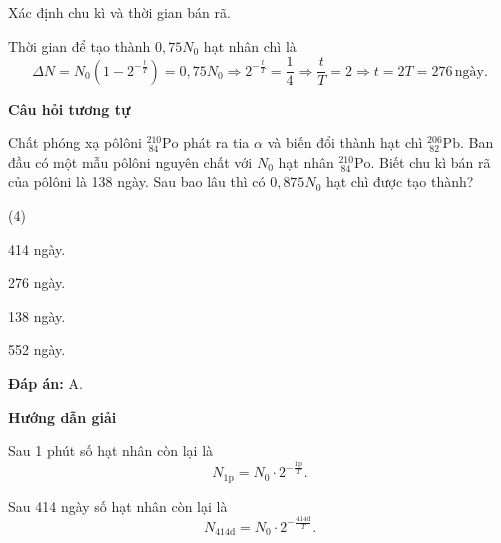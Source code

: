 \begin{dang}{Xác định chu kì và thời gian bán rã.}
{	Thời gian để tạo thành $0,75N_0$ hạt nhân chì là
	\begin{equation*}
	\Delta N= N_0\left( 1-2^{-\frac{t}{T}}\right)=0,75N_0\Rightarrow 2^{-\frac{t}{T}}=\dfrac{1}{4}\Rightarrow\dfrac{t}{T}=2\Rightarrow t=2T=276\,\text{ngày}.
	\end{equation*}
	
	\begin{center}
		\textbf{Câu hỏi tương tự}
	\end{center}
	
	Chất phóng xạ pôlôni $^{210}_{\ 84}\text{Po}$ phát ra tia $\alpha$ và biến đổi thành hạt chì $^{206}_{\ 82}\text{Pb}$. Ban đầu có một mẫu pôlôni nguyên chất với $N_0$ hạt nhân $^{210}_{\ 84}\text{Po}$. Biết chu kì bán rã của pôlôni là 138 ngày. Sau bao lâu thì có $0,875N_0$ hạt chì được tạo thành?
	\begin{mcq}(4)
		\item 414 ngày.
		\item 276 ngày.
		\item 138 ngày.
		\item 552 ngày.
	\end{mcq}
	
	\textbf{Đáp án:} A.}
	
	{
	\begin{center}
		\textbf{Hướng dẫn giải}
	\end{center}
	
	Sau 1 phút số hạt nhân còn lại là
	\begin{equation*}
	N_{1\text{p}}= N_0\cdot 2^{-\frac{1\text{p}}{T}}.
	\end{equation*}
	
	Sau 414 ngày số hạt nhân còn lại là
	\begin{equation*}
	N_{414\text{d}}= N_0\cdot 2^{-\frac{414\text{d}}{T}}.
	\end{equation*}
	
}
\end{dang}
